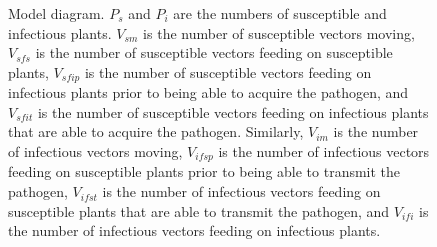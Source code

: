 \documentclass{article}
\begin{document}
\begin{figure}
  \caption{Model diagram.  $P_s$ and $P_i$ are the numbers
    of susceptible and infectious plants.  $V_{sm}$ is the number of
    susceptible vectors moving, $V_{sfs}$ is the number of susceptible
    vectors feeding on susceptible plants, $V_{sfip}$ is the number of
    susceptible vectors feeding on infectious plants prior to being
    able to acquire the pathogen, and $V_{sfit}$ is the number of
    susceptible vectors feeding on infectious plants that are able to
    acquire the pathogen.  Similarly, $V_{im}$ is the number of
    infectious vectors moving, $V_{ifsp}$ is the number of infectious
    vectors feeding on susceptible plants prior to being able to
    transmit the pathogen, $V_{ifst}$ is the number of infectious
    vectors feeding on susceptible plants that are able to transmit the
    pathogen, and $V_{ifi}$ is the number of infectious vectors
    feeding on infectious plants.}
  \label{fig:full_model_diagram}
\end{figure}
\end{document}
